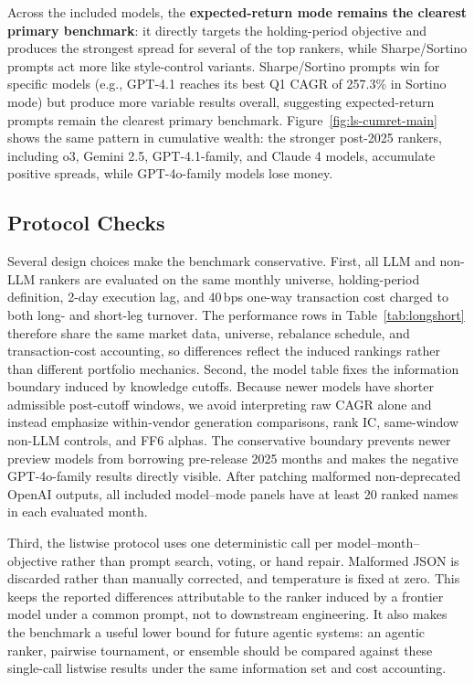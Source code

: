 Across the included models, the \textbf{expected-return mode remains the clearest primary benchmark}: it directly targets the holding-period objective and produces the strongest spread for several of the top rankers, while Sharpe/Sortino prompts act more like style-control variants.
Sharpe/Sortino prompts win for specific models (e.g., GPT-4.1 reaches its best Q1 CAGR of 257.3\% in Sortino mode) but produce more variable results overall, suggesting expected-return prompts remain the clearest primary benchmark.
Figure~\ref{fig:ls-cumret-main} shows the same pattern in cumulative wealth: the stronger post-2025 rankers, including o3, Gemini 2.5, GPT-4.1-family, and Claude 4 models, accumulate positive spreads, while GPT-4o-family models lose money.

\subsection{Protocol Checks}

Several design choices make the benchmark conservative.
First, all LLM and non-LLM rankers are evaluated on the same monthly universe, holding-period definition, 2-day execution lag, and 40\,bps one-way transaction cost charged to both long- and short-leg turnover.
The performance rows in Table~\ref{tab:longshort} therefore share the same market data, universe, rebalance schedule, and transaction-cost accounting, so differences reflect the induced rankings rather than different portfolio mechanics.
Second, the model table fixes the information boundary induced by knowledge cutoffs.
Because newer models have shorter admissible post-cutoff windows, we avoid interpreting raw CAGR alone and instead emphasize within-vendor generation comparisons, rank IC, same-window non-LLM controls, and FF6 alphas.
The conservative boundary prevents newer preview models from borrowing pre-release 2025 months and makes the negative GPT-4o-family results directly visible.
After patching malformed non-deprecated OpenAI outputs, all included model--mode panels have at least 20 ranked names in each evaluated month.

Third, the listwise protocol uses one deterministic call per model--month--objective rather than prompt search, voting, or hand repair.
Malformed JSON is discarded rather than manually corrected, and temperature is fixed at zero.
This keeps the reported differences attributable to the ranker induced by a frontier model under a common prompt, not to downstream engineering.
It also makes the benchmark a useful lower bound for future agentic systems: an agentic ranker, pairwise tournament, or ensemble should be compared against these single-call listwise results under the same information set and cost accounting.


